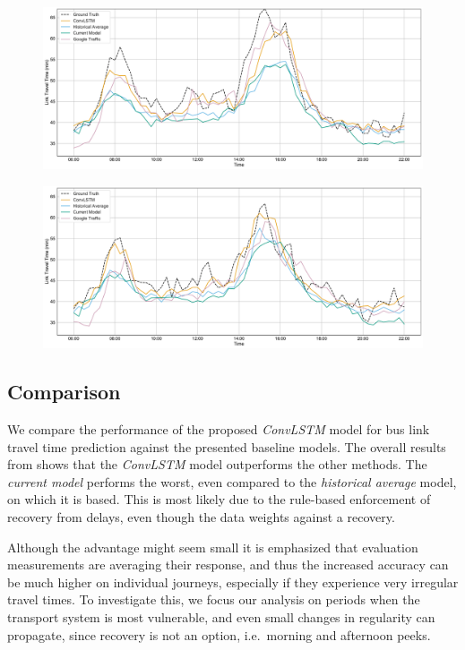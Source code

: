\documentclass[preprint,11pt,5p,twocolumn]{elsarticle}
\begin{document}
\begin{figure}
  \centering
  \includegraphics[width=\textwidth]{plots/comparison_day.pdf}
  \caption{}
  \label{fig:comparison_day}
\end{figure}
\begin{figure}
  \centering
  \includegraphics[width=\textwidth]{plots/comparison_day_2.pdf}
  \caption{}
  \label{fig:comparison_day_2}
\end{figure}


\subsection{Comparison}
We compare the performance of the proposed \emph{ConvLSTM} model for bus link travel time prediction against the presented baseline models. The overall results from  shows that the \emph{ConvLSTM} model outperforms the other methods. The \emph{current model} performs the worst, even compared to the \emph{historical average} model, on which it is based. This is most likely due to the rule-based enforcement of recovery from delays, even though the data weights against a recovery.

Although the advantage might seem small it is emphasized that evaluation measurements are averaging their response, and thus the increased accuracy can be much higher on individual journeys, especially if they experience very irregular travel times. To investigate this, we focus our analysis on periods when the transport system is most vulnerable, and even small changes in regularity can propagate, since recovery is not an option, i.e.\ morning and afternoon peeks.
\end{document}
